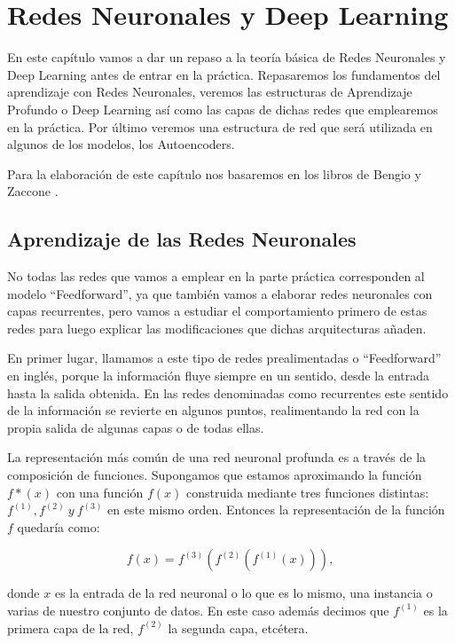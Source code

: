 \chapter{Redes Neuronales y Deep Learning}
\label{chapter:redes-neuronales-deep-learning}

En este capítulo vamos a dar un repaso a la teoría básica de Redes Neuronales y Deep Learning antes de entrar en la práctica. Repasaremos los fundamentos del aprendizaje con Redes Neuronales, veremos las estructuras de Aprendizaje Profundo o Deep Learning así como las capas de dichas redes que emplearemos en la práctica. Por último veremos una estructura de red que será utilizada en algunos de los modelos, los Autoencoders.

Para la elaboración de este capítulo nos basaremos en los libros de Bengio \cite{goodfellow_deep_2016} y Zaccone \cite{giancarlo_deep_2017}.

\section{Aprendizaje de las Redes Neuronales}

No todas las redes que vamos a emplear en la parte práctica corresponden al modelo ``Feedforward'', ya que también vamos a elaborar redes neuronales con capas recurrentes, pero vamos a estudiar el comportamiento primero de estas redes para luego explicar las modificaciones que dichas arquitecturas añaden.

En primer lugar, llamamos a este tipo de redes prealimentadas o ``Feedforward'' en inglés, porque la información fluye siempre en un sentido, desde la entrada hasta la salida obtenida. En las redes denominadas como recurrentes este sentido de la información se revierte en algunos puntos, realimentando la red con la propia salida de algunas capas o de todas ellas.

La representación más común de una red neuronal profunda es a través de la composición de funciones. Supongamos que estamos aproximando la función $f*(x)$ con una función $f(x)$ construida mediante tres funciones distintas: $f^{(1)}, f^{(2)} \ y \ f^{(3)}$ en este mismo orden. Entonces la representación de la función $f$ quedaría como:

$$f(x) = f^{(3)}(f^{(2)}(f^{(1)}(x))),$$

donde $x$ es la entrada de la red neuronal o lo que es lo mismo, una instancia o varias de nuestro conjunto de datos. En este caso además decimos que $f^{(1)}$ es la primera capa de la red, $f^{(2)}$ la segunda capa, etcétera.

